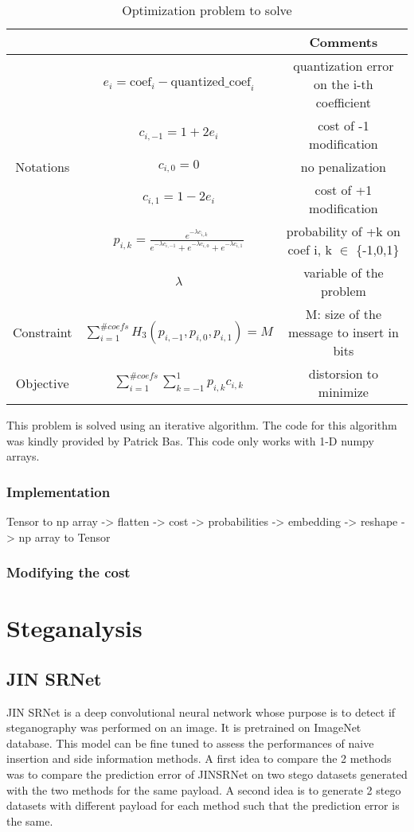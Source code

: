 \documentclass[12pt]{article}
\begin{document}
\begin{table}[H]
\begin{tabular}{ |c|c|c| }
    \hline
    &  & Comments\\
    \hline
    & $e_i = \text{coef}_i - \text{quantized\_coef}_i$ & quantization error on the i-th coefficient\\ 
    & $c_{i,-1} = 1 + 2e_i$ & cost of -1 modification\\ 
    Notations & $c_{i,0} = 0$ & no penalization\\
    & $c_{i,1} = 1 - 2e_i$ & cost of +1 modification\\
    & $p_{i,k} = \frac{e^{-\lambda c_{i,k}}}{e^{-\lambda c_{i,-1}} + e^{-\lambda c_{i,0}} + e^{-\lambda c_{i,1}}}$ & probability of +k on coef i, k $\in$ \{-1,0,1\}\\
    & $\lambda$ & variable of the problem\\
    \hline
    Constraint & $\displaystyle\sum_{i=1}^{\# coefs}{H_3(p_{i,-1},p_{i,0},p_{i,1})} = M$ & M: size of the message to insert in bits\\
    \hline
    Objective & $\displaystyle\sum_{i=1}^{\# coefs}{\sum_{k=-1}^{1}{p_{i,k}c_{i,k}}}$ & distorsion to minimize \\ 
    \hline
\end{tabular}
\caption[Optimization under constraints]{Optimization problem to solve}
\end{table}
This problem is solved using an iterative algorithm. The code for this algorithm was kindly provided by Patrick Bas. This code only works with 1-D numpy arrays.

\subsubsection{Implementation}
Tensor to np array -> flatten -> cost -> probabilities -> embedding -> reshape -> np array to Tensor 
\subsubsection{Modifying the cost}
\section{Steganalysis}
\subsection{JIN SRNet}
JIN SRNet is a deep convolutional neural network whose purpose is to detect if steganography was performed on an image. It is pretrained on ImageNet database. This model can be fine tuned to assess the performances of naive insertion and side information methods. A first idea to compare the 2 methods was to compare the prediction error of JINSRNet on two stego datasets generated with the two methods for the same payload. A second idea is to generate 2 stego datasets with different payload for each method such that the prediction error is the same. 
\end{document}
